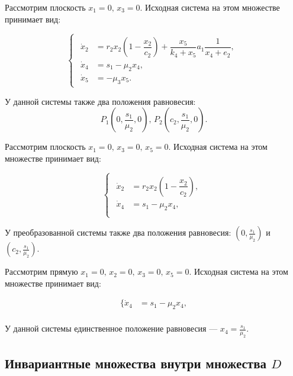 \documentclass[14pt,a4paper]{extarticle}
\begin{document}
	Рассмотрим плоскость $x_1=0,\, x_3=0$. Исходная система на этом множестве принимает вид:
	
	\begin{equation*}
		\begin{cases}
			\begin{aligned}
				\dot{x}_2 &= r_2x_2\left(1-\dfrac{x_2}{c_2}\right)+\dfrac{x_5}{k_4+x_5}a_1\dfrac{1}{x_4+e_2},\\
				\dot{x}_4 &= s_1 -\mu_2x_4,\\
				\dot{x}_5 &= -\mu_3x_5.
			\end{aligned}
		\end{cases}
	\end{equation*}
	
	У данной системы также два положения равновесия:
	\[P_1\left(0,\frac{s_1}{\mu_2},0\right),\, P_2\left(c_2,\frac{s_1}{\mu_2},0\right).\]
	
	Рассмотрим плоскость $x_1=0,\, x_3=0,\, x_5=0$. Исходная система на этом множестве принимает вид:
	
	\begin{equation*}
		\begin{cases}
			\begin{aligned}
				\dot{x}_2 &= r_2x_2\left(1-\dfrac{x_2}{c_2}\right),\\
				\dot{x}_4 &= s_1 -\mu_2x_4,\\
			\end{aligned}
		\end{cases}
	\end{equation*}
	
	У преобразованной системы также два положения равновесия: $\left(0,\frac{s_1}{\mu_2}\right)$ и $\left(c_2,\frac{s_1}{\mu_2}\right)$.
	
	Рассмотрим прямую $x_1=0,\, x_2=0,\, x_3=0,\, x_5=0$. Исходная система на этом множестве принимает вид:
	
	\begin{equation*}
		\begin{aligned}
			\{\dot{x}_4 &= s_1 -\mu_2x_4,\\
		\end{aligned}
	\end{equation*}
	
	У данной системы единственное положение равновесия --- $x_4=\frac{s_1}{\mu_2}$.
	
	\subsection{Инвариантные множества внутри множества $D$}
	
\end{document}
